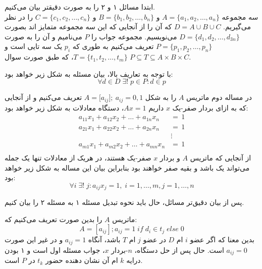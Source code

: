 \documentclass[]{article}
\begin{document}
ابتدا مسائل ۱ و ۲ را به صورت دقیقتر بیان می‌کنیم.
\\
سه مجموعه $A = \lbrace a_1, a_2, \dots, a_n \rbrace$ و
$B = \lbrace b_1, b_2, \dots, b_n \rbrace$ و
$C = \lbrace c_1, c_2, \dots, c_n \rbrace$ را در نظر می‌گیریم.
$D = A \cup B \cup C$ که آن را از آنجایی که این سه مجموعه متمایز اند بصورت
$D = \lbrace d_1, d_2, \dots, d_{3n} \rbrace$ می‌نویسیم.
مجموعه جواب را $P$ می‌نامیم و آن را
به صورت $P = \lbrace p_1, p_2, \dots, p_{n} \rbrace$ تعریف می‌کنیم
به طوری که $p_i$ یک سه تایی است و $T = \lbrace t_1, t_2, \dots, t_m \rbrace$،
که طبق صورت سوال $P \subseteq T \subseteq A \times B \times C$.

با توجه به تعاریف بالا، بیان مسئله به شکل زیر خواهد بود:
$$\forall d \in D \; \exists! \; p \in P : d \in p$$

در مساله دوم ماتریس $A$ را به شکل $A = \lbrack a_{ij} \rbrack ; \: a_{ij} = 0, 1$
تعریف می‌کنیم و از آنجایی که به ازای بردار صفر-یک $x$ داریم $Ax = 1$،
دستگاه معادلات به شکل زیر خواهد بود:
\begin{align*}
    a_{11}x_1+a_{12}x_2 + \dots + a_{1n}x_n &= \,1 \\
    a_{21}x_1+a_{22}x_2 + \dots + a_{2n}x_n &= \,1 \\
    & \vdots \\
    a_{m1}x_1+a_{m2}x_2 + \dots + a_{mn}x_n &= \,1 \\
\end{align*}
از آنجایی که ماتریس $A$ و بردار $x$ صفر-یک هستند،
در هریک از معادلات تنها یک جمله می‌تواند یک باشد و بقیه صفر خواهند بود بنابراین بیان این مساله
به شکل زیر خواهد بود:
$$\forall i \; \exists! \; j : a_{ij}x_j = 1, \; i = 1, \dots, m, j = 1, \dots, n$$

پس از بیان دقیق‌تر مسائل، حال باید نحوه تبدیل مسئله ۱ به مسئله ۲ را بیان کنیم.

ماتریس $A$ را بدین صورت تعریف می‌کنیم که:
$$A = [a_{ij}]; a_{ij} = 1 \; if \; d_i \in t_j \; else \; 0$$
بدین معنا که اگر عضو $i$ ام $D$
در عضو $j$ ام $T$ باشد، آنگاه $a_{ij} = 1$ و در غیر این صورت $a_{ij} = 0$ است.
حال پس از حل دستگاه، $n$-بردار $x$، جواب مسئله اول است و ۱ بودن درایه $k$ ام آن
نشان دهنده حضور $t_k$ در $P$ است.
\end{document}

